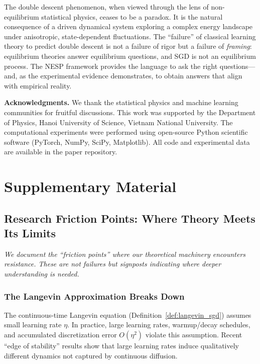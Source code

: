 \documentclass[
  journal=largetwo,
  year=2025,
  volume=37,
]{cup-journal}
\begin{document}
The double descent phenomenon, when viewed through the lens of non-equilibrium statistical physics, ceases to be a paradox. It is the natural consequence of a driven dynamical system exploring a complex energy landscape under anisotropic, state-dependent fluctuations. The ``failure'' of classical learning theory to predict double descent is not a failure of rigor but a failure of \textit{framing}: equilibrium theories answer equilibrium questions, and SGD is not an equilibrium process. The NESP framework provides the language to ask the right questions---and, as the experimental evidence demonstrates, to obtain answers that align with empirical reality.

\vspace{12pt}
\noindent\textbf{Acknowledgments.} We thank the statistical physics and machine learning communities for fruitful discussions. This work was supported by the Department of Physics, Hanoi University of Science, Vietnam National University. The computational experiments were performed using open-source Python scientific software (PyTorch, NumPy, SciPy, Matplotlib). All code and experimental data are available in the paper repository.

\appendix
\section{Supplementary Material}\label{app:supplementary}

\subsection{Research Friction Points: Where Theory Meets Its Limits}\label{app:friction_points}

\textit{We document the ``friction points'' where our theoretical machinery encounters resistance. These are not failures but signposts indicating where deeper understanding is needed.}

\subsubsection{The Langevin Approximation Breaks Down}
The continuous-time Langevin equation (Definition~\ref{def:langevin_sgd}) assumes small learning rate $\eta$. In practice, large learning rates, warmup/decay schedules, and accumulated discretization error $O(\eta^2)$ violate this assumption. Recent ``edge of stability'' results \cite{cohen2021gradient} show that large learning rates induce qualitatively different dynamics not captured by continuous diffusion.
\end{document}

